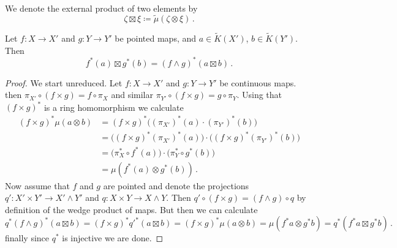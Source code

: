 \begin{definition}
	We denote the external product of two elements by
	\begin{equation*}
		\zeta \boxtimes \xi \coloneq \tilde{\mu}(\zeta \otimes \xi)\,.
	\end{equation*}
\end{definition}
\begin{proposition}[Naturality]
	Let $f:X\to X'$ and $g:Y\to Y'$ be pointed maps, and $a\in \tilde{K}(X')$, $b \in \tilde{K}(Y')$. Then 
	\begin{equation*}
		f^*(a)\boxtimes g^*(b)=(f \wedge g)^*(a \boxtimes b)\,.
	\end{equation*}
\end{proposition}
\begin{proof}
	We start unreduced. Let $f:X\to X'$ and $g:Y\to Y'$ be continuous maps. then $\pi_{X'}\circ (f\times g)=f\circ \pi_X$ and similar $\pi_{Y'}\circ (f\times g)=g\circ \pi_{Y}$. Using that $(f\times g)^*$ is a ring homomorphism we calculate
	\begin{align*}
		(f\times g)^*\mu(a \otimes b)
		&=(f\times g)^*\Big((\pi_{X'})^*(a)\cdot (\pi_{Y'})^*(b)\Big)\\
		&=\big((f\times g)^*(\pi_{X'})^*(a)\big)\cdot \big((f\times g)^*(\pi_{Y'})^*(b)\big)\\
		&=\big(\pi_X^*\circ f^*(a)\big)\cdot \big(\pi_Y^*\circ g^*(b)\big)\\
		&=\mu(f^*(a)\otimes g^*(b))\,.
	\end{align*} Now assume that $f$ and $g$ are pointed and denote the projections $q':X'\times Y' \to X' \wedge Y'$ and $q:X\times Y \to X\wedge Y$. Then 
	$q'\circ (f\times g)=(f\wedge g )\circ q$ by definition of the wedge product of maps. But then we can calculate
	\begin{equation*}
		q^*(f\wedge g)^*(a\boxtimes b)=(f\times g)^*{q'}^*(a\boxtimes b)=(f\times g)^* \mu(a\otimes b)=\mu(f^*a\otimes g^*b)=q^*(f^*a\boxtimes g^*b) \,.
	\end{equation*}finally since $q^*$ is injective we are done.
\end{proof}


